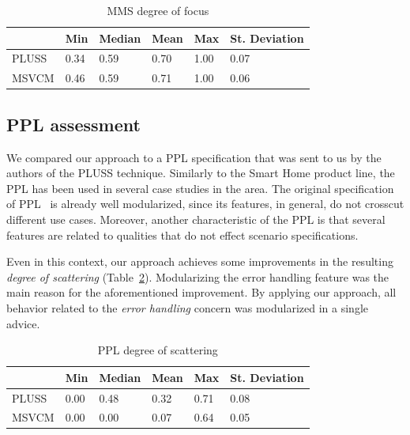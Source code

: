 \begin{table}[htb] \centering
\caption{MMS degree of focus}
\label{tab:mms-dof}
\begin{small}
\begin{tabular}{llllll} \hline
					& Min 	& Median 	& Mean 	& Max 	& St. Deviation \\ \hline 
	PLUSS			& 0.34	& 0.59		& 0.70	& 1.00	& 0.07			\\
	MSVCM			& 0.46  & 0.59   	& 0.71 	& 1.00 	& 0.06			\\ \hline	
\end{tabular}
\end{small}
\end{table}

\subsection{PPL assessment}

We compared our approach to a PPL specification that was sent to us by the
authors of the PLUSS technique. Similarly to the Smart Home product line, the PPL has been used in several case
studies in the area. The original specification of PPL~\cite{PPL:2008} is already well
modularized, since its features, in general, do not crosscut different
use cases. Moreover, another characteristic of the PPL is that several features
are related to qualities that do not effect scenario specifications.

Even in this context, our approach achieves some improvements in the
resulting \emph{degree of scattering} (Table~\ref{tab:ppl-dos}). Modularizing the error handling feature was the main reason for the
aforementioned improvement. By applying our approach, all behavior related to
the \emph{error handling} concern was modularized in a single advice. 

\begin{table}[htb] \centering
\caption{PPL degree of scattering}
\label{tab:ppl-dos}
\begin{small}
\begin{tabular}{llllll} \hline
					& Min 	& Median 	& Mean 	& Max 	& St. Deviation \\ \hline 
	PLUSS			& 0.00	& 0.48		& 0.32	& 0.71	& 0.08			\\
	MSVCM			& 0.00  & 0.00   	& 0.07 	& 0.64 	& 0.05			\\ \hline	
\end{tabular}
\end{small}
\end{table}




